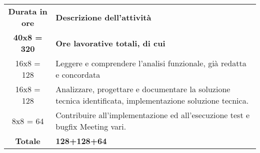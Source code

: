 

\begin{tabularx}{\textwidth}{|c|X|}
	\hline
	\textbf{Durata in ore} & \textbf{Descrizione dell'attività} \\
	\textbf{40x8 = 320} & \textbf{Ore lavorative totali, di cui} \\
	\hline
	16x8 = 128 & Leggere e comprendere l’analisi funzionale, già redatta e concordata \\
	\hline
	16x8 = 128 & Analizzare, progettare e documentare la soluzione tecnica identificata, implementazione soluzione tecnica. \\
	\hline
	8x8 = 64 & Contribuire all’implementazione ed all’esecuzione test e bugfix Meeting vari.\\
	\hline
	\textbf{Totale} &\textbf{128+128+64}\\
	\hline
\end{tabularx}